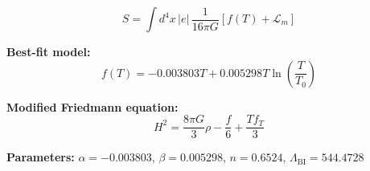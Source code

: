 
\begin{equation}
  S = \int d^4x \, |e| \, \frac{1}{16\pi G} \left[ f(T) + \mathcal{L}_m \right]
\end{equation}

\textbf{Best-fit model:}
\begin{equation}
  f(T) = -0.003803 T + 0.005298 T \ln\!\left(\frac{T}{T_0}\right)
\end{equation}

\textbf{Modified Friedmann equation:}
\begin{equation}
  H^2 = \frac{8\pi G}{3} \rho - \frac{f}{6} + \frac{T f_T}{3}
\end{equation}

\textbf{Parameters:}
$\alpha = -0.003803$, \quad
$\beta = 0.005298$, \quad
$n = 0.6524$, \quad
$\Lambda_{\text{BI}} = 544.4728$